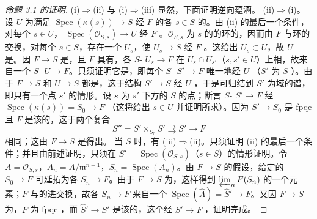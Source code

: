 \begin{proof}[命题 3.1 的证明]
(i)$\Rightarrow$(ii) 与 (i)$\Rightarrow$(iii) 显然，下面证明逆向蕴涵。
(ii)$\Rightarrow$(i)。设 $U$ 为满足 $\operatorname{Spec}(\kappa(s))\to S$ 经 $F$ 的各 $s\in S$ 的。由 (ii) 的最后一个条件，对每个 $s\in U$， $\operatorname{Spec}(\mathscr O_{S,s})\to U$ 经 $F$ 。$\mathscr O_{S,s}$ 为 $s$ 的的环的，因而由 $F$ 与环的交换，对每个 $s\in S$，存在一个 $U_s$，使 $U_s\to S$ 经 $F$ 。这给出 $U_s\subset U$，故 $U$ 是。因 $F\to S$ 是，且 $F$ 具有，各 $S$- $U_s\to F$ 在 $U_s\cap U_{s'}$（$s,s'\in U$）上相，故来自一个 $S$- $U\to F$。只须证明它是，即每个 $S$- $S'\to F$ 唯一地经 $U$ （$S'$ 为 $S$-）。由于 $F\to S$ 和 $U\to S$ 都是，这于结构 $S'\to S$ 经 $U$ ，于是可归结到 $S'$ 为域的谱，即只有一个点 $s'$ 的情形。设 $s$ 为 $s'$ 下方的 $S$ 的点；断言 $S$- $S'\to F$ 经 $\operatorname{Spec}(\kappa(s))=S_0\to F$ （这将给出 $s\in U$ 并证明所求）。因为 $S'\to S_0$ 是 fpqc 且 $F$ 是该的，这于两个复合
\[S''=S'\times_{S_0}S'\rightrightarrows S'\longrightarrow F\]
相同；这由 $F\to S$ 是得出。
当 $S$ 时，有 (iii)$\Rightarrow$(ii)。只须证明 (ii) 的最后一个条件；并且由前述证明，只须在 $S'=\operatorname{Spec}(\mathscr O_{S,s})$（$s\in S$）的情形证明。令 $A=\mathscr O_{S,s}$，$A_n=A/\mathfrak m^{n+1}$，$S_n=\operatorname{Spec}(A_n)$。由 $F\to S$ 的假设，给定的 $S_0\to F$ 可延拓为各 $S_n\to F$。由于 $F\to S$ 为，这样得到 $\varprojlim_n F(S_n)$ 的一个元素；$F$ 与的进交换，故各 $S_n\to F$ 来自一个 $\operatorname{Spec}(\widehat A)=\widehat S'\to F$。又因 $F\to S$ 为，$F$ 为 fpqc ，而 $\widehat S'\to S'$ 是该的，这个经 $S'\to F$ ，证明完成。
\end{proof}

